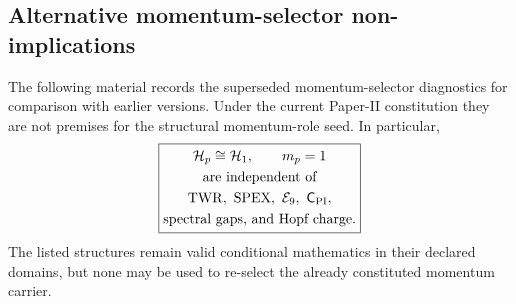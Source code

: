 \documentclass[11pt,a4paper]{article}
\begin{document}
\subsection{Alternative momentum-selector non-implications}
\label{p2d:app:legacy-selector-diagnostics}
The following material records the superseded momentum-selector diagnostics
for comparison with earlier versions.  Under the current Paper-II
constitution they are not premises for the structural momentum-role seed.  In
particular,
\[
 \boxed{\begin{gathered}
 \mathcal H_p\cong\mathcal H_1,\qquad m_p=1\\
 \text{are independent of}\\
 \mathrm{TWR},\ \mathrm{SPEX},\ \mathcal E_9,\
 \mathsf C_{\rm PI},\\
 \text{spectral gaps, and Hopf charge}.
 \end{gathered}}
\]
The listed structures remain valid conditional mathematics in their declared
domains, but none may be used to re-select the already constituted momentum
carrier.
\end{document}
